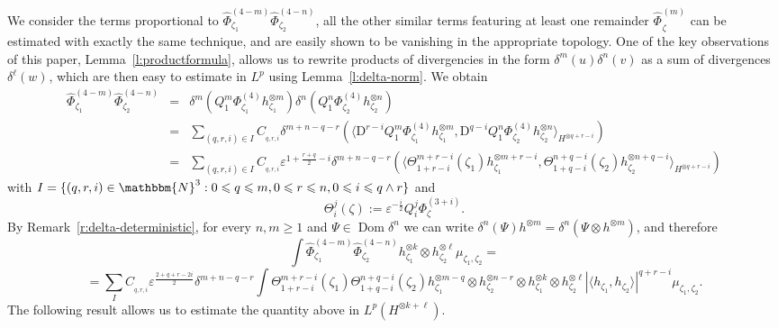 \documentclass[a4paper,11pt]{article}
\newcommand{\assign}{:=}
\newcommand{\mathD}{\mathrm{D}}
\newcommand{\tmop}[1]{\ensuremath{\operatorname{#1}}}
\begin{document}
We consider the terms proportional to $\hat{\Phi}^{(4 - m)}_{\zeta_1}
\hat{\Phi}^{(4 - n)}_{\zeta_2}$, all the other similar terms featuring at
least one remainder $\widehat{\Phi_{}}_{\zeta}^{(m)}$ can be estimated with
exactly the same technique, and are easily shown to be vanishing in the
appropriate topology. One of the key observations of this paper,
Lemma~\ref{l:productformula}, allows us to rewrite products of divergencies in
the form $\delta^m (u) \delta^n (v)$ as a sum of divergences $\delta^{\ell}
(w)^{}$, which are then easy to estimate in $L^p$ using
Lemma~\ref{l:delta-norm}. We obtain
\begin{eqnarray*}
  \hat{\Phi}^{(4 - m)}_{\zeta_1} \hat{\Phi}^{(4 - n)}_{\zeta_2} & = & \delta^m
  (Q_1^m \Phi^{(4)}_{\zeta_1} h^{\otimes m}_{\zeta_1}) \delta^n (Q_1^n
  \Phi^{(4)}_{\zeta_2} h_{\zeta_2}^{\otimes n})\\
  & = & \sum_{(q, r, i) \in I} C_{_{q, r, i}} \delta^{m + n - q - r} (\langle
  \mathD^{r - i} Q_1^m \Phi^{(4)}_{\zeta_1} h_{\zeta_1}^{\otimes m}, \mathD^{q
  - i} Q_1^n \Phi^{(4)}_{\zeta_2} h_{\zeta_2}^{\otimes n} \rangle_{H^{\otimes
  q + r - i}})^{}\\
  & = & \sum_{(q, r, i) \in I} C_{_{q, r, i}} \varepsilon^{1 + \frac{r +
  q}{2} - i} \delta^{m + n - q - r} (\langle \Theta^{m + r - i}_{1 + r - i}
  (\zeta_1) h_{\zeta_1}^{\otimes m + r - i}, \Theta_{1 + q - i}^{n + q - i}
  (\zeta_2) h^{\otimes n + q - i}_{\zeta_2} \rangle_{H^{\otimes q + r - i}})
\end{eqnarray*}
with $I = \{ (q, r, i) \in \mathbbm{N}^3 : 0 \leqslant q \leqslant m, 0
\leqslant r \leqslant n, 0 \leqslant i \leqslant q \wedge r \}$ and
\[ \Theta_i^j (\zeta) \assign \varepsilon^{- \frac{i}{2}} Q^j_i
   \Phi_{\zeta}^{(3 + i)} . \]
By Remark~\ref{r:delta-deterministic}, for every $n, m \geqslant 1$ and $\Psi
\in \tmop{Dom} \delta^n$ we can write $\delta^n (\Psi) h^{\otimes m} =
\delta^n (\Psi \otimes h^{\otimes m})$, and therefore
\[ \int \hat{\Phi}^{(4 - m)}_{\zeta_1} \hat{\Phi}_{\zeta_2}^{(4 - n)}
   h^{\otimes k}_{\zeta_1} \otimes h^{\otimes \ell}_{\zeta_2} \mu_{\zeta_1,
   \zeta_2} = \]
\[ = \sum_I C_{_{q, r, i}} \varepsilon^{\frac{2 + q + r - 2 i}{2}} \delta^{m +
   n - q - r} \int \Theta^{m + r - i}_{1 + r - i} (\zeta_1) \Theta_{1 + q -
   i}^{n + q - i} (\zeta_2) h_{\zeta_1}^{\otimes m - q} \otimes h^{\otimes n -
   r}_{\zeta_2} \otimes h^{\otimes k}_{\zeta_1} \otimes h^{\otimes
   \ell}_{\zeta_2} | \langle h_{\zeta_1}, h_{\zeta_2} \rangle |^{q + r - i}
   \mu_{\zeta_1, \zeta_2} . \]
The following result allows us to estimate the quantity above in $L^p
(H^{\otimes k + \ell})$.
\end{document}

